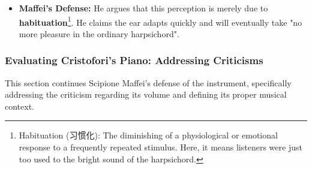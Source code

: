 \documentclass[math,code]{amznotes}
\theoremstyle{remark}
\begin{document}
\begin{itemize}
\begin{itemize}
        \item They felt the tone was "muffled and dull" compared to the usual "silvery sound" of harpsichords.
    \end{itemize}
    \item \textbf{Maffei's Defense:} He argues that this perception is merely due to \textbf{habituation}\footnote{Habituation (习惯化): The diminishing of a physiological or emotional response to a frequently repeated stimulus. Here, it means listeners were just too used to the bright sound of the harpsichord.}. He claims the ear adapts quickly and will eventually take "no more pleasure in the ordinary harpsichord".
\end{itemize}

\subsubsection{Evaluating Cristofori's Piano: Addressing Criticisms}

This section continues Scipione Maffei's defense of the instrument, specifically addressing the criticism regarding its volume and defining its proper musical context.
\end{document}
